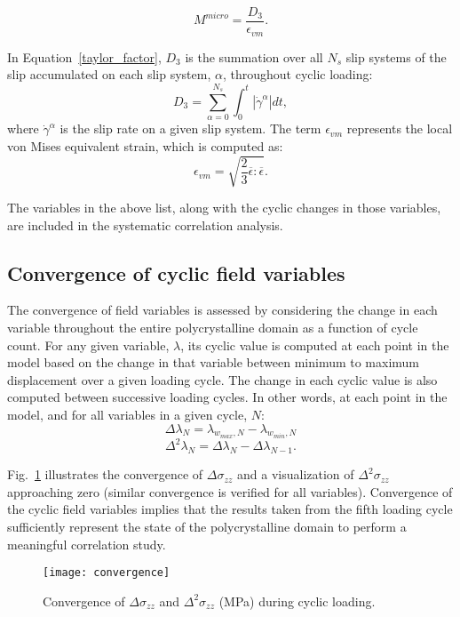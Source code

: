 \begin{equation}
\label{taylor_factor}
M^{micro} = \frac{D_3}{\epsilon_{vm}}.
\end{equation}

In Equation~\ref{taylor_factor}, $D_3$ is the summation over all $N_s$ slip systems of the slip accumulated on each slip system, $\alpha$, throughout cyclic loading:
\begin{equation}\label{D3}
D_3 = \sum_{\alpha=0}^{N_s}{\int_0^t {|\dot{\gamma}^{\alpha}|}dt},
\end{equation}
where $\dot{\gamma}^{\alpha}$ is the slip rate on a given slip system. The term $\epsilon_{vm}$ represents the local von Mises equivalent strain, which is computed as:
\begin{equation}\label{vonmises}
\epsilon_{vm} = \sqrt{\frac{2}{3} \overline{\epsilon} : \overline{\epsilon}}.
\end{equation}

The variables in the above list, along with the cyclic changes in those variables, are included in the systematic correlation analysis.

\subsection{Convergence of cyclic field variables}\label{convergence}
The convergence of field variables is assessed by considering the change in each variable throughout the entire polycrystalline domain as a function of cycle count. For any given variable, $\lambda$, its cyclic value is computed at each point in the model based on the change in that variable between minimum to maximum displacement over a given loading cycle. The change in each cyclic value is also computed between successive loading cycles. In other words, at each point in the model, and for all variables in a given cycle, $N$:
\begin{equation}\label{deltas}
\Delta \lambda_N = \lambda_{w_{max}, N} - \lambda_{w_{min}, N}\end{equation}
\begin{equation} \Delta^2 \lambda_N = \Delta \lambda_N - \Delta \lambda_{N-1}. \end{equation}

Fig.~\ref{fig:convergence} illustrates the convergence of $\Delta \sigma_{zz}$ and a visualization of $\Delta ^2 \sigma_{zz}$ approaching zero (similar convergence is verified for all variables). Convergence of the cyclic field variables implies that the results taken from the fifth loading cycle sufficiently represent the state of the polycrystalline domain to perform a meaningful correlation study.
\begin{figure}[b]
  \centering
    \texttt{[image: convergence]}
    \caption{Convergence of $\Delta \sigma_{zz}$ and $\Delta ^2 \sigma_{zz}$ (MPa) during cyclic loading.}
    \label{fig:convergence}
\end{figure}
 
